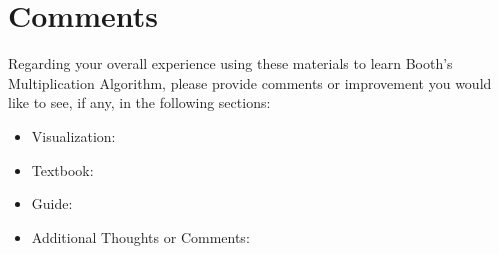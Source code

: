 \documentclass[letter]{article}
\begin{document}
\begin{enumerate}
\begin{comment}
\section*{Question Questions}

\item I frequently guessed on the pop-up questions.
(Agree / Disagree)

\item The questions were ambiguous or confusing.%
(Agree / Disagree)

\section*{Other Questions}

\item The use of colors in the visualization was confusing or unclear.
(Agree / Disagree) %

\item The input generator was easy to understand and use.%
(Agree / Disagree)

\item I read through some parts of the hypertext book more than once to improve my understanding of the topic.
(True) (False)

\item The guide was informative and helpful for setting up and using the visualization.
(Agree / Disagree) (This question is for our own reference and will not be analysed for research purposes) %

\end{comment}

\end{enumerate}

\section*{Comments}

Regarding your overall experience using these materials to learn Booth's Multiplication Algorithm, please provide comments or improvement you would like to see, if any, in the following sections:
\begin{itemize}
\item Visualization:
\vspace{.75cm}
\item Textbook:
\vspace{.75cm}
\item Guide:
\vspace{.75cm}
\item Additional Thoughts or Comments:

\end{itemize}
\end{document}
